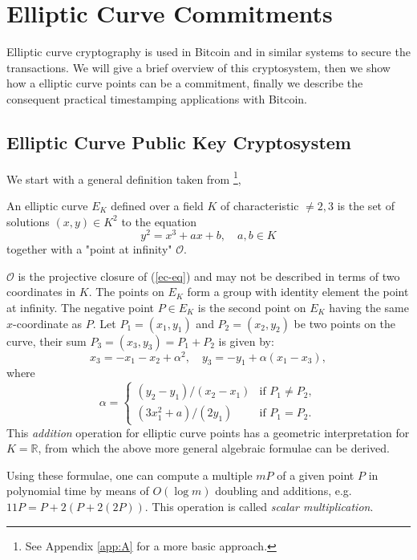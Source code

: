 \chapter{Elliptic Curve Commitments}
\label{chpr:ec-commitments}
Elliptic curve cryptography is used in Bitcoin and in similar systems to secure the transactions. 
We will give a brief overview of this cryptosystem, then we show how a elliptic curve points can be a commitment, finally we describe the consequent practical timestamping applications with Bitcoin.  

\section{Elliptic Curve Public Key Cryptosystem}
We start with a general definition taken from \cite{Koblitz1987}\footnote{See Appendix \ref{app:A} for a more basic approach.},
\begin{mydef}
	An elliptic curve $E_K$ defined over a field $K$ of characteristic $\neq 2, 3$ is the set of solutions $(x,y)\in K^2$ to the equation
	\begin{equation}
	\label{ec-eq}
	y^2 = x^3 + ax + b, \quad a,b \in K
	\end{equation}
	together with a "point at infinity" $\mathcal{O}$.
\end{mydef}
$\mathcal{O}$ is the projective closure of (\ref{ec-eq}) and may not be described in terms of two coordinates in $K$.
The points on $E_K$ form a group with identity element the point at infinity. The negative point $P \in E_K$ is the second point on $E_K$ having the same $x$-coordinate as $P$. Let $P_1=(x_1,y_1)$ and $P_2=(x_2,y_2)$ be two points on the curve, their sum $P_3=(x_3,y_3) = P_1 + P_2$ is given by:
\begin{equation}
x_3 = -x_1 -x_2 + \alpha^2, \quad 
y_3 = -y_1 + \alpha(x_1 - x_3),
\end{equation}
where
\begin{equation}
\alpha = \begin{cases}
			(y_2 - y_1)/(x_2 - x_1) & \textrm{if } P_1 \neq P_2, \\
			(3x_1^2 + a)/(2y_1) & \textrm{if } P_1 = P_2.
\end{cases}
\end{equation}
This \textit{addition} operation for elliptic curve points has a geometric interpretation for $K = \mathbb{R}$, from which the above more general algebraic formulae can be derived.

Using these formulae, one can compute a multiple $mP$ of a given point $P$ in polynomial time by means of $O(\log m)$ doubling and additions, e.g. $11P = P + 2(P + 2(2P))$. This operation is called \textit{scalar multiplication}.

